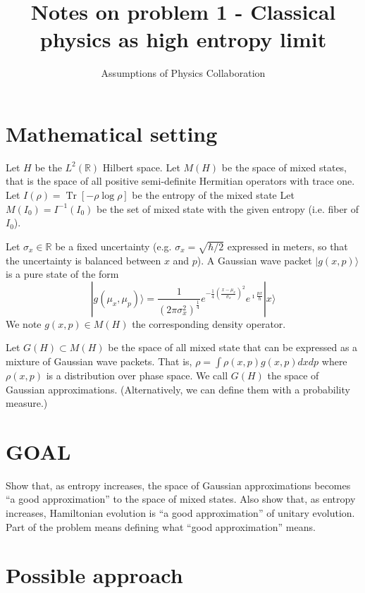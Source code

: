 \documentclass[11pt]{article}
\def\>{\rangle}
\DeclareMathOperator{\Tr}{Tr}
\begin{document}
	\title{Notes on problem 1 - Classical physics as high entropy limit}
	\author{Assumptions of Physics Collaboration}

	\date{}

	\maketitle

\section{Mathematical setting}

Let $H$ be the $L^2(\mathbb{R})$ Hilbert space. Let $M(H)$ be the space of mixed states, that is the space of all positive semi-definite Hermitian operators with trace one. Let $I(\rho) = \Tr [-\rho \log \rho]$ be the entropy of the mixed state Let $M(I_0) = I^{-1}(I_0)$ be the set of mixed state with the given entropy (i.e. fiber of $I_0$).

Let $\sigma_x \in \mathbb{R}$ be a fixed uncertainty (e.g. $\sigma_x = \sqrt{\hbar/2}$ expressed in meters, so that the uncertainty is balanced between $x$ and $p$). A Gaussian wave packet $|g(x,p)\>$ is a pure state of the form
\begin{equation}
	|g(\mu_x,\mu_p)\> = \frac{1}{(2 \pi \sigma_x^2)^{\frac{1}{4}}} e^{-\frac{1}{4} \left(\frac{x-\mu_x}{\sigma_x}\right)^2} e^{\imath \frac{px}{\hbar}} | x \>
\end{equation}
We note $g(x,p) \in M(H)$ the corresponding density operator.

Let $G(H) \subset M(H)$ be the space of all mixed state that can be expressed as a mixture of Gaussian wave packets. That is, $\rho = \int \rho(x, p) g(x, p) dx dp$ where $\rho(x, p)$ is a distribution over phase space. We call $G(H)$ the space of Gaussian approximations. (Alternatively, we can define them with a probability measure.)

\section{GOAL}

Show that, as entropy increases, the space of Gaussian approximations becomes ``a good approximation'' to the space of mixed states. Also show that, as entropy increases, Hamiltonian evolution is ``a good approximation'' of unitary evolution. Part of the problem means defining what ``good approximation'' means.

\section{Possible approach}
\end{document}
